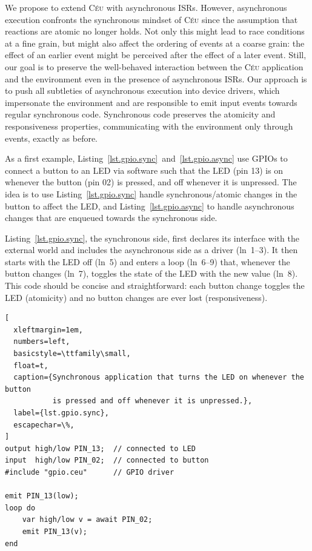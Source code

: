 \documentclass[sigplan,10pt,review,anonymous]{acmart}\settopmatter{printfolios=true,printccs=false,printacmref=false}
\newcommand{\CEU}{\textsc{C\'{e}u}\xspace}
\begin{document}
We propose to extend \CEU with asynchronous ISRs.
However, asynchronous execution confronts the synchronous mindset of \CEU since
the assumption that reactions are atomic no longer holds.
Not only this might lead to race conditions at a fine grain, but might also
affect the ordering of events at a coarse grain: the effect of an earlier event
might be perceived after the effect of a later event.
%
Still, our goal is to preserve the well-behaved interaction between the \CEU
application and the environment even in the presence of asynchronous ISRs.
%
Our approach is to push all subtleties of asynchronous execution into device
drivers, which impersonate the environment and are responsible to emit input
events towards regular synchronous code.
%
Synchronous code preserves the atomicity and responsiveness properties,
communicating with the environment only through events, exactly as before.

As a first example, Listing~\ref{lst.gpio.sync}~and~\ref{lst.gpio.async} use
GPIOs to connect a button to an LED via software such that the LED (pin 13) is
on whenever the button (pin 02) is pressed, and off whenever it is unpressed.
%
The idea is to use Listing~\ref{lst.gpio.sync} handle synchronous/atomic
changes in the button to affect the LED, and Listing~\ref{lst.gpio.async} to
handle asynchronous changes that are enqueued towards the synchronous side.

Listing~\ref{lst.gpio.sync}, the synchronous side, first declares its interface
with the external world and includes the asynchronous side as a driver
(ln~1--3).
It then starts with the LED off (ln~5) and enters a loop (ln~6--9) that,
whenever the button changes (ln~7), toggles the state of the LED with the new
value (ln~8).
%
This code should be concise and straightforward: each button change toggles the
LED (atomicity) and no button changes are ever lost (responsiveness).

\begin{lstlisting}[
  xleftmargin=1em,
  numbers=left,
  basicstyle=\ttfamily\small,
  float=t,
  caption={Synchronous application that turns the LED on whenever the button
           is pressed and off whenever it is unpressed.},
  label={lst.gpio.sync},
  escapechar=\%,
]
output high/low PIN_13;  // connected to LED
input  high/low PIN_02;  // connected to button
#include "gpio.ceu"      // GPIO driver

emit PIN_13(low);
loop do
    var high/low v = await PIN_02;
    emit PIN_13(v);
end
\end{lstlisting}
\end{document}
